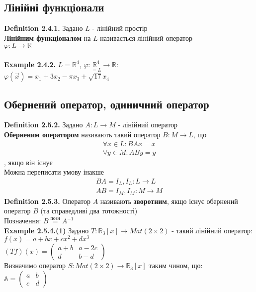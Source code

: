 \documentclass[a4paper, 14pt]{extarticle}
\def\defin#1{\textbf{Definition {#1}}}
\def\ex#1{\textbf{Example {#1}}}
\def\bigline{\vspace{5mm}\\}
\begin{document}
	\subsection{Лінійні функціонали}
	\defin{2.4.1.} Задано $L$ - лінійний простір\\
	\textbf{Лінійним функціоналом} на $L$ називається лінійний оператор \\ $\varphi: L \to \mathbb{R}$\\
	\\
	\ex{2.4.2.}
	$L=\mathbb{R}^4$, $\varphi: \underset{=L}{\mathbb{R}^4} \to \mathbb{R}:$\\
	$\varphi(\vec{x}) = x_1 + 3x_2 - \pi x_3 + \sqrt{17}x_4$
	\bigline
	
	\subsection{Обернений оператор, одиничний оператор}
	\defin{2.5.2.} Задано $A: L \to M$ - лінійний оператор\\
	\textbf{Оберненим оператором} називають такий оператор $B: M \to L$, що
	\begin{align*}
	\forall x \in L: BAx = x \\
	\forall y \in M: ABy = y
	\end{align*},
	якщо він існує\\
	Можна переписати умову інакше
	\begin{align*}
	BA = I_L, I_L: L \to L\\
	AB = I_M, I_M: M \to M
	\end{align*}
	\defin{2.5.3.} Оператор $A$ називають \textbf{зворотним}, якщо існує обернений оператор $B$ (та справедливі два тотожності) \\
	Позначення: $B \overset{\textrm{позн}}{=} A^{-1}$
	\bigline
	\ex{2.5.4.(1)} Задано $T: \mathbb{R}_3[x] \to Mat(2 \times 2)$ - такий лінійний оператор:\\
	$f(x) = a + bx + cx^2 + dx^3$\\
	$(Tf)(x) = \begin{pmatrix}
	a+b & a-2c \\
	d & b-d
	\end{pmatrix}$\\
	Визначимо оператор $S: Mat(2 \times 2) \to \mathbb{R}_3[x]$ таким чином, що:\\
	$\mathbb{A} = \begin{pmatrix}
	a & b \\
	c & d
	\end{pmatrix}$\\
\end{document}
